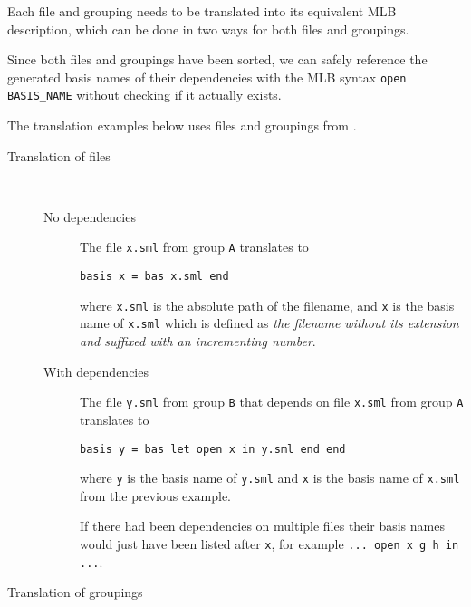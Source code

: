 Each file and grouping needs to be translated into its equivalent MLB
description, which can be done in two ways for both files and groupings. 

Since both files and groupings have been sorted, we can safely reference the
generated basis names of their dependencies with the MLB syntax \texttt{open
  BASIS_NAME} without checking if it actually exists.

The translation examples below uses files and groupings from
.


\begin{description}
  
\item[Translation of files] \
  \begin{description}
   
  \item[No dependencies]
    
    The file \texttt{x.sml} from group \texttt{A} translates to
    
\begin{lstlisting}
basis x = bas x.sml end      
\end{lstlisting}
    
    where \texttt{x.sml} is the absolute path of the filename, and \texttt{x} is
    the basis name of \texttt{x.sml} which is defined as \textit{the filename
      without its extension and suffixed with an incrementing number}.
        
  \item[With dependencies]
    
    The file \texttt{y.sml} from group \texttt{B} that depends on file
    \texttt{x.sml} from group \texttt{A} translates to
    
\begin{lstlisting}
basis y = bas let open x in y.sml end end
\end{lstlisting}
    
    where \texttt{y} is the basis name of \texttt{y.sml} and \texttt{x} is the
    basis name of \texttt{x.sml} from the previous example.
    
    If there had been dependencies on multiple files their basis names would
    just have been listed after \texttt{x}, for example \texttt{... open x g h
      in ...}.
    
  \end{description}
  
\item[Translation of groupings]
  

\end{description}
